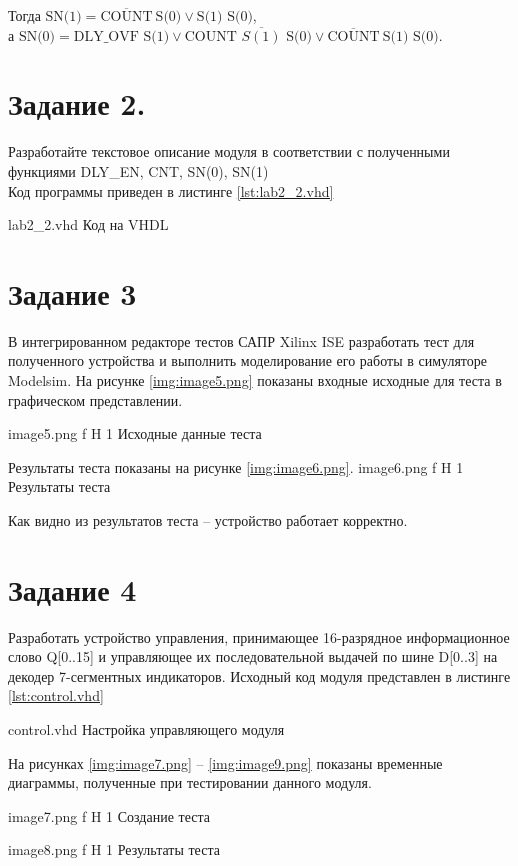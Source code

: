 \documentclass{bmstu}
\begin{document}
Тогда $\text{SN(1)} = \overline{\text{COUNT}} ~ \text{S(0)} \vee \text{S(1) S(0)} $,  \\
а  $\text{SN(0)} = \text{DLY\_OVF S(1)} \vee \text{COUNT $\overline{S(1)}$ S(0)} \vee \overline{\text{COUNT}}~ \text{S(1) S(0)}$. 

\section*{Задание 2. }
Разработайте текстовое описание модуля в соответствии с полученными
функциями DLY\_EN, CNT, SN(0), SN(1)\\
Код программы приведен в листинге \ref{lst:lab2_2.vhd}

	{lab2_2.vhd}
	{Код на VHDL}

\section*{Задание 3}
В интегрированном редакторе тестов САПР Xilinx ISE разработать тест для полученного устройства и выполнить моделирование его работы в симуляторе Modelsim.
На рисунке \ref{img:image5.png} показаны входные исходные для теста в графическом представлении.

	{image5.png}
	{f}
	{H}
	{1\textwidth}
	{Исходные данные теста}


	Результаты теста показаны на рисунке \ref{img:image6.png}.
	{image6.png}
	{f}
	{H}
	{1\textwidth}
	{Результаты теста}

	Как видно из результатов теста – устройство работает корректно.

\section*{Задание 4}
	Разработать устройство управления, принимающее 16-разрядное информационное слово Q[0..15] и управляющее их последовательной выдачей по шине D[0..3] на декодер 7-сегментных индикаторов.
	Исходный код модуля представлен в листинге \ref{lst:control.vhd}

	{control.vhd}
	{Настройка управляющего модуля}

На рисунках \ref{img:image7.png} -- \ref{img:image9.png} показаны временные диаграммы, полученные при тестировании данного модуля.

	{image7.png}
	{f}
	{H}
	{1\textwidth}
	{Создание теста}
	
	{image8.png}
	{f}
	{H}
	{1\textwidth}
	{Результаты теста}
	
\end{document}
